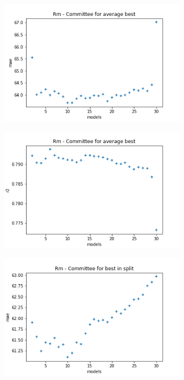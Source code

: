 \begin{figure}
     \centering
     \begin{subfigure}[b]{0.49\textwidth}
         \centering
         \includegraphics[width=\textwidth]{images/Rm_avg_mae.png}
         \caption{}
         \label{fig:ea-avg-mae-rm}
     \end{subfigure}
     \begin{subfigure}[b]{0.49\textwidth}
         \centering
         \includegraphics[width=\textwidth]{images/Rm_avg_r2.png}
         \caption{}
         \label{fig:ea-avg-r2-rm}
     \end{subfigure}
     \hfill
     \begin{subfigure}[b]{0.49\textwidth}
         \centering
         \includegraphics[width=\textwidth]{images/Rm_split_mae.png}

\end{subfigure}
\end{figure}
